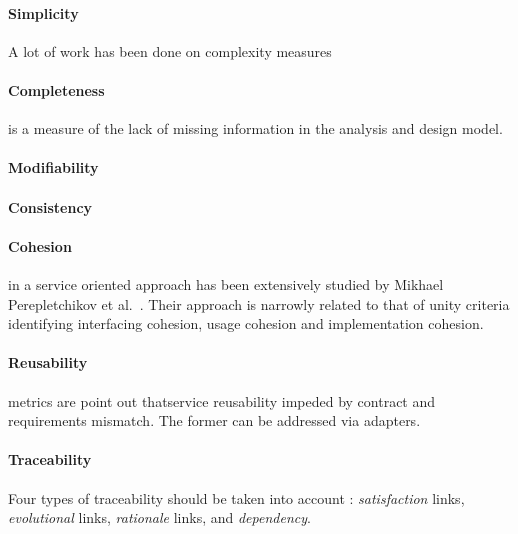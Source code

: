 \paragraph{Simplicity} A lot of work has been done on complexity measures

\paragraph{Completeness} is a measure of the lack of missing information in the analysis and design model.

\paragraph{Modifiability}

\paragraph{Consistency}

\paragraph{Cohesion} in a service oriented approach has been extensively studied by Mikhael Perepletchikov et al.\ \cite{perepletchikov_cohesion_2007,perepletchikov_impact_2010}. Their approach is narrowly related to that of unity criteria \cite{gonzalez_unity_2009} identifying interfacing cohesion, usage cohesion and implementation cohesion.

\paragraph{Reusability} metrics are \cite{khoshkbarforoushha_metric_2010,choi_quality_2008,feuerlicht_determinants_2007,}
\cite{khoshkbarforoushha_metric_2010} point out thatservice reusability impeded by contract and requirements mismatch. The former can be addressed via adapters.

\paragraph{Traceability} Four types of traceability should be taken into account \cite{ramesh_toward_2001}: \emph{satisfaction} links, \emph{evolutional} links, \emph{rationale} links, and \emph{dependency}.


